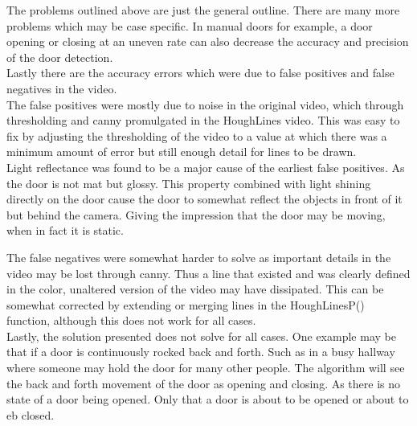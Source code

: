 \documentclass{article}
\begin{document}
The problems outlined above are just the general outline. There are many more problems which may be case specific. In manual doors for example, a door opening or closing at an uneven rate can also decrease the accuracy and precision of the door detection.\\
Lastly there are the accuracy errors which were due to false positives and false negatives in the video.\\
The false positives were mostly due to noise in the original video, which through thresholding and canny promulgated in the HoughLines video. This was easy to fix by adjusting the thresholding of the video to a value at which there was a minimum amount of error but still enough detail for lines to be drawn.\\
Light reflectance was found to be a major cause of the earliest false positives. As the door is not mat but glossy. This property combined with light shining directly on the door cause the door to somewhat reflect the objects in front of it but behind the camera. Giving the impression that the door may be moving, when in fact it is static.


The false negatives were somewhat harder to solve as important details in the video may be lost through canny. Thus a line that existed and was clearly defined in the color, unaltered version of the video may have dissipated. This can be somewhat corrected by extending or merging lines in the HoughLinesP() function, although this does not work for all cases. \\

Lastly, the solution presented does not solve for all cases. One example may be that if a door is continuously rocked back and forth. Such as in a busy hallway where someone may hold the door for many other people. The algorithm will see the back and forth movement of the door as opening and closing. As there is no state of a door being opened. Only that a door is about to be opened or about to eb closed.\\









\pagebreak
\end{document}

